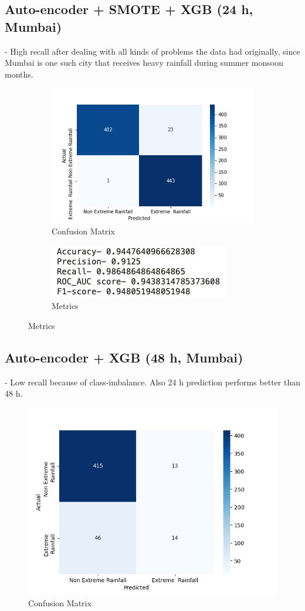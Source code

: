 \documentclass[11pt,a4paper]{article}
\begin{document}
\subsection{\textbf{Auto-encoder + SMOTE + XGB (24 h, Mumbai)}} - High recall after dealing with all kinds of problems the data had originally, since Mumbai is one such city that receives heavy rainfall during summer monsoon months.
\begin{figure}[!htp]
\begin{subfigure}{.5\textwidth}
\centering
\includegraphics[width=\linewidth]{y_mumbai.png}
\caption{Confusion Matrix}
\end{subfigure}%
\begin{subfigure}{.5\textwidth}
\centering
\includegraphics[width=.8\linewidth]{res_mumbai.png}
\caption{Metrics}
\end{subfigure}
\end{figure}

\medskip

\subsection{\textbf{Auto-encoder + XGB (48 h, Mumbai)}} - Low recall because of class-imbalance. Also 24 h prediction performs better than 48 h.
\begin{figure}[!h]
\centering
\includegraphics[width=.4\linewidth]{mumbai.png}
\caption{Confusion Matrix}
\end{figure}
\end{document}
